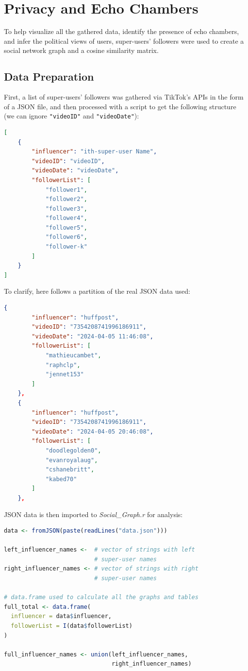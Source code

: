 \section{Privacy and Echo Chambers}

To help visualize all the gathered data, identify the presence of echo chambers, and infer the political views of users, super-users' followers were used to create a social network graph and a cosine similarity matrix.

\subsection{Data Preparation}

First, a list of super-users' followers was gathered via TikTok's APIs in the form of a JSON file, and then processed with a script to get the following structure (we can ignore \verb+"videoID"+ and \verb+"videoDate"+):

\begin{lstlisting}[language=json]
[
    {
        "influencer": "ith-super-user Name",
        "videoID": "videoID",
        "videoDate": "videoDate",
        "followerList": [
            "follower1",
            "follower2",
            "follower3",
            "follower4",
            "follower5",
            "follower6",
            "follower-k"
        ]
    }
]
\end{lstlisting}

To clarify, here follows a partition of the real JSON data used:

\begin{lstlisting}[language=json]
    {
        "influencer": "huffpost",
        "videoID": "7354208741996186911",
        "videoDate": "2024-04-05 11:46:08",
        "followerList": [
            "mathieucambet",
            "raphclp",
            "jennet153"
        ]
    },
    {
        "influencer": "huffpost",
        "videoID": "7354208741996186911",
        "videoDate": "2024-04-05 20:46:08",
        "followerList": [
            "doodlegolden0",
            "evanroyalaug",
            "cshanebritt",
            "kabed70"
        ]
    },
\end{lstlisting}

JSON data is then imported to \textit{Social\_Graph.r} for analysis:

\begin{lstlisting}[language=R]
data <- fromJSON(paste(readLines("data.json")))

left_influencer_names <-  # vector of strings with left 
                          # super-user names
right_influencer_names <- # vector of strings with right 
                          # super-user names

# data.frame used to calculate all the graphs and tables
full_total <- data.frame(
  influencer = data$influencer,
  followerList = I(data$followerList)
)

full_influencer_names <- union(left_influencer_names, 
                               right_influencer_names)
\end{lstlisting}

